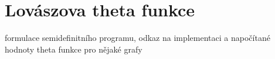 \chapter{Lovászova theta funkce}

formulace semidefinitního programu, odkaz na implementaci a napočítané hodnoty theta funkce pro nějaké grafy
